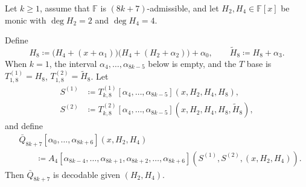 \begin{lemma}\label{lem:barQ8k+7}
    Let $k\ge 1$, assume that $\mathbb F$ is $(8k+7)$-admissible, and let
    $H_2,H_4\in\mathbb{F}[x]$ be monic with $\deg H_2=2$ and $\deg H_4=4$.

    Define
    \[
      H_8 \coloneqq \bigl(H_4+(x+\alpha_1)\bigr)\bigl(H_4+(H_2+\alpha_2)\bigr)+\alpha_0,
      \qquad
      \tilde H_8 \coloneqq H_8+\alpha_3.
    \]
    When $k=1$, the interval $\alpha_4,\ldots,\alpha_{8k-5}$ below is empty,
    and the $T$ base is $T^{(1)}_{1,8}=H_8$,
    $T^{(2)}_{1,8}=\widetilde H_8$.
    Let
    \[
      \begin{aligned}
      S^{(1)}&\coloneqq
        T^{(1)}_{k,8}[\alpha_4,\ldots,\alpha_{8k-5}]
          (x,H_2,H_4,H_8),\\
      S^{(2)}&\coloneqq
        T^{(2)}_{k,8}[\alpha_4,\ldots,\alpha_{8k-5}]
          (x,H_2,H_4,H_8,\widetilde H_8),
      \end{aligned}
    \]
    and define
    \[
      \begin{aligned}
      &\bar Q_{8k+7}[\alpha_0,\ldots,\alpha_{8k+6}](x,H_2,H_4)\\
      &\qquad\coloneqq
      A_{4}[\alpha_{8k-4},\ldots,\alpha_{8k+1},
            \alpha_{8k+2},\ldots,\alpha_{8k+6}]
           (S^{(1)},S^{(2)},(x,H_2,H_4)).
      \end{aligned}
    \]
    Then $\bar Q_{8k+7}$ is decodable given $(H_2,H_4)$.
\end{lemma}
